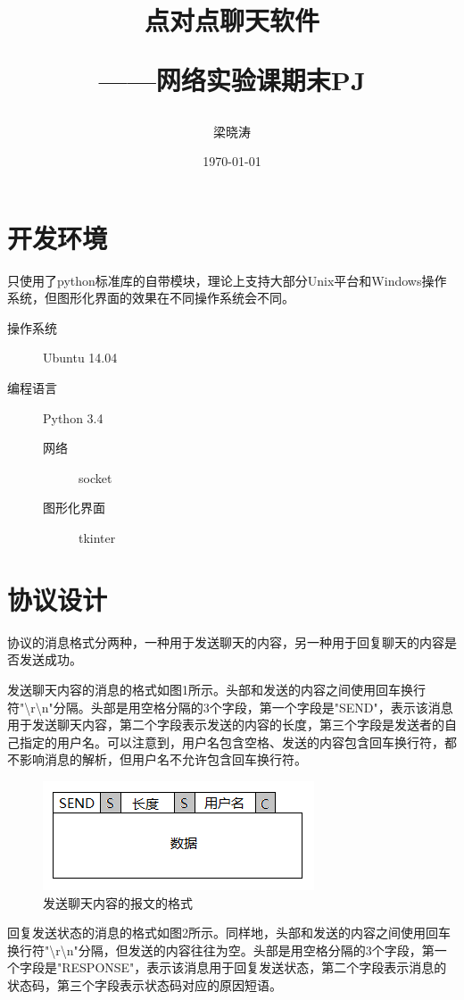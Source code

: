 \documentclass[a4paper, nofonts, nocap]{ctexart}
\title{点对点聊天软件 \\ \begin{large}——网络实验课期末PJ \end{large}}
\author{梁晓涛\quad 13307130319}
\date{\today}
\begin{document}
\maketitle

\section{开发环境}
只使用了python标准库的自带模块，理论上支持大部分Unix平台和Windows操作系统，但图形化界面的效果在不同操作系统会不同。
\begin{description}
	\item[操作系统] Ubuntu 14.04
	\item[编程语言] Python 3.4
		\begin{description}
			\item[网络] socket
			\item[图形化界面] tkinter
		\end{description}
\end{description}

\section{协议设计}
协议的消息格式分两种，一种用于发送聊天的内容，另一种用于回复聊天的内容是否发送成功。

发送聊天内容的消息的格式如图1所示。头部和发送的内容之间使用回车换行符"\textbackslash r\textbackslash n"分隔。头部是用空格分隔的3个字段，第一个字段是"SEND"，表示该消息用于发送聊天内容，第二个字段表示发送的内容的长度，第三个字段是发送者的自己指定的用户名。可以注意到，用户名包含空格、发送的内容包含回车换行符，都不影响消息的解析，但用户名不允许包含回车换行符。

\begin{figure}[ht]
	\centering
	\includegraphics{images/send.png}
	\caption{发送聊天内容的报文的格式}
\end{figure}

回复发送状态的消息的格式如图2所示。同样地，头部和发送的内容之间使用回车换行符"\textbackslash r\textbackslash n"分隔，但发送的内容往往为空。头部是用空格分隔的3个字段，第一个字段是"RESPONSE"，表示该消息用于回复发送状态，第二个字段表示消息的状态码，第三个字段表示状态码对应的原因短语。
\end{document}
